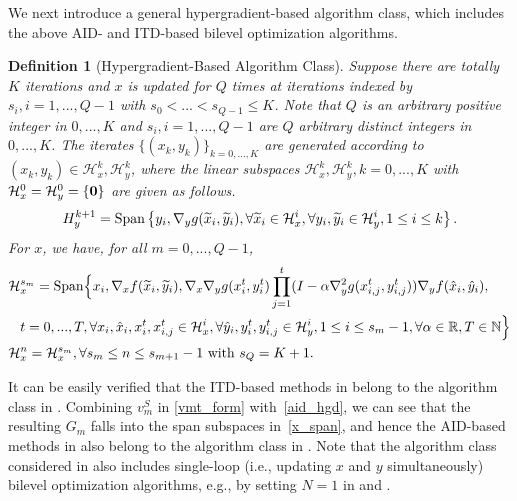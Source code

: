 \documentclass{osudissert96}
\newtheorem{definition}{Definition}
\begin{document}
We next introduce a general hypergradient-based algorithm class, which includes the above AID- and ITD-based bilevel optimization algorithms. 
\begin{definition}[Hypergradient-Based Algorithm Class]\label{alg_class}
Suppose there are totally $K$ iterations and $x$ is updated for $Q$ times at iterations indexed by $s_i,i=1,...,Q-1$ with $s_0<...<s_{Q-1}\leq K$. Note that $Q$ is an arbitrary  positive integer in $0,...,K$ and $s_i,i=1,...,Q-1$ are $Q$ arbitrary distinct integers in $0,...,K$. The iterates $\{(x_k,y_k)\}_{k=0,...,K}$ are generated according to $(x_k,y_k)\in\mathcal{H}_x^k, \mathcal{H}_y^k$, where the linear subspaces $\mathcal{H}_x^k, \mathcal{H}_y^k, k=0,...,K$ with $\mathcal{H}_x^{0} = \mathcal{H}_y^0=\{{\bf 0 }\}$ are given as follows. 
\begin{align}\label{hxk}
H_y^{k+1} = \text{\normalfont Span}\left\{y_i,\nabla_y g(\widetilde x_i,\widetilde y_i), \forall \widetilde x_i\in\mathcal{H}_x^i,\forall y_i,\widetilde y_i\in\mathcal{H}_y^i, 1\leq i \leq k \right\}.  
\end{align}
For $x$, we have, for all $m=0,..., Q-1$,  
\begin{align}\label{x_span}
&\mathcal{H}_x^{s_m} =  \text{\normalfont Span} \Big\{x_i,\nabla_xf(\widetilde x_i,\widetilde y_i),\nabla_x\nabla_y g( x_{i}^t, y_{i}^t)\prod_{j=1}^t(I-\alpha \nabla_y^2g(x_{i,j}^t,y_{i,j}^t))\nabla_y f(\hat x_i,\hat y_i), \nonumber
\\&\hspace{0.3cm}t=0,...,T,\forall x_i, \hat x_i, x_{i}^t,x_{i,j}^t \in \mathcal{H}_x^i, \forall \hat y_i, y_{i}^t,y_{i,j}^t \in \mathcal{H}_y^i, 1\leq i \leq s_m-1, \forall \alpha\in\mathbb{R}, T\in \mathbb{N}\Big\}\nonumber
\\ &\mathcal{H}_x^n = \mathcal{H}_x^{s_m}, \forall s_m\leq n\leq s_{m+1}-1 \text{ with } s_Q=K+1. 
\end{align}
\end{definition}
It can be easily verified that the ITD-based methods in  belong to the algorithm class in  . 
Combining $v_m^S$ in \cref{vmt_form} with~\cref{aid_hgd}, we can see that the resulting $G_m$ falls into the span subspaces in~\cref{x_span}, and hence the AID-based methods in  also belong to the algorithm class in  . 
Note that the algorithm class considered in  also includes single-loop (i.e., updating $x$ and $y$ simultaneously) bilevel optimization algorithms, e.g., by setting $N=1$ in  and . 
\end{document}
